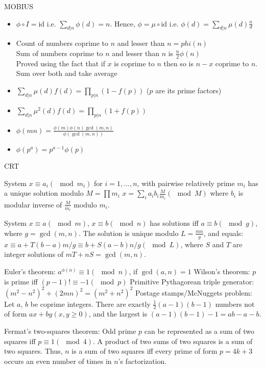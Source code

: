 MOBIUS

\begin{itemize}

\item $\phi \circ I = \text{id}$ i.e. $\sum_{d|n} \phi(d)=n$. Hence, $\phi = \mu \circ \text{id}$ i.e. $\phi(d)=\sum_{d|n} \mu(d) \frac{n}{d}$
\item Count of numbers coprime to $n$ and lesser than $n = phi(n)$ \\
    Sum of numbers coprime to $n$ and lesser than $n$  is $\frac{n}{2}\phi(n)$ \\
    Proved using the fact that if $x$ is coprime to $n$ then so is $n-x$ coprime to $n$. Sum over both and take average
\item $\sum_{d|n} \mu(d)f(d)=\prod_{p|n} (1 - f(p))$ ($p$ are its prime factors)
\item $\sum_{d|n} \mu^2(d)f(d)=\prod_{p|n} (1 + f(p))$
\item $\phi(mn) = \frac{\phi(m)\phi(n)\gcd(m,n)}{\phi(\gcd(m,n))}$
\item $\phi(p^a) = p^{a-1}\phi{(p)}$
\end{itemize}


CRT

System $x \equiv a_i(\mod m_i)$ for $i = 1, \ldots, n$, with pairwise relatively prime $m_i$ has a unique solution modulo $M = \prod m_i$
$x=\sum_{i} a_ib_i\frac M{m_i} (\mod M)$ where $b_i$ is modular inverse of $\frac M{m_i}$ modulo $m_i$.

System $x \equiv a (\mod m)$, $x \equiv b (\mod n)$ has solutions iff $a \equiv b (\mod g)$, where $g = \gcd(m, n)$. The
solution is unique modulo $L = \frac{mn}{g}$, and equals: $x \equiv a + T (b − a)m/g \equiv b + S(a − b)n/g (\mod L)$,
where $S$ and $T$ are integer solutions of $mT + nS = \gcd(m, n)$.


Euler's theorem: $a^{\phi(n)}\equiv 1(\mod n)$, if $\gcd(a,n)=1$
Wilson's theorem: $p$ is prime iff $(p-1)! \equiv -1(\mod p)$
Primitive Pythagorean triple generator: $(m^2-n^2)^2 + (2mn)^2 = (m^2+n^2)^2$
Postage stamps/McNuggets problem: Let $a$, $b$ be coprime integers. There are exactly $\frac 12(a−1)(b−1)$ numbers not of form $ax+by (x, y \geq 0)$, and the largest is $(a−1)(b−1)−1 = ab−a−b$.

Fermat’s two-squares theorem: Odd prime $p$ can be represented as a sum of two squares iff
$p \equiv 1 (\mod 4)$. A product of two sums of two squares is a sum of two squares. Thus, $n$ is a sum of
two squares iff every prime of form $p = 4k + 3$ occurs an even number of times in $n$’s factorization.

